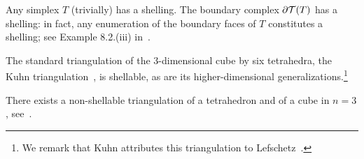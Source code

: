 \documentclass[10pt,a4paper]{article}
\newcommand{\mwl}[1]{{\color{red}#1}}
\begin{document}
\begin{example}\label{example:shell_simpl}
    Any simplex $T$ (trivially) has a shelling. The boundary complex $\partial {\mathcal T}(T)$ has a shelling:
    in fact, any enumeration of the boundary faces of $T$ constitutes a shelling\mwl{; see Example 8.2.(iii) in~\cite{ziegler1995lectures}}.
\end{example}
\begin{example}
    The standard triangulation of the $3$-dimensional cube by six tetrahedra, the Kuhn triangulation~\cite{kuhn1960some}, is shellable, as are its higher-dimensional generalizations.\footnote{We remark that Kuhn attributes this triangulation to Lefschetz~\cite{lefschetz2015introduction}.}
\end{example}
\begin{example}
    There exists a non-shellable triangulation of a tetrahedron and of a cube in $n=3$, see~\cite[Example 8.9]{ziegler1995lectures}.
\end{example}
\end{document}
